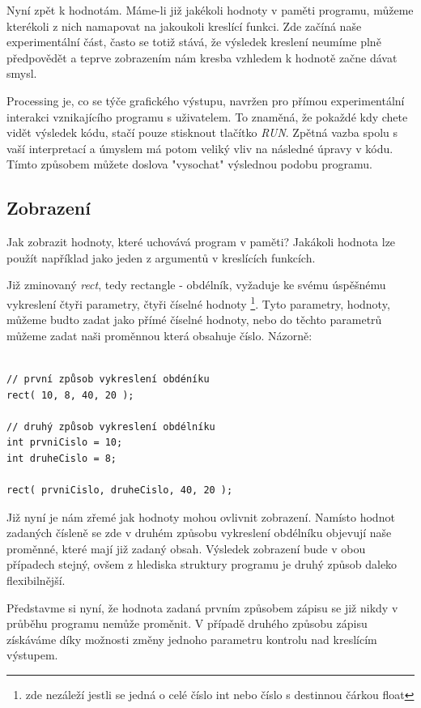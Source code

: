 \documentclass[11pt]{article}
\begin{document}
Nyní zpět k hodnotám. Máme-li již jakékoli hodnoty v paměti programu, můžeme kterékoli z nich namapovat na jakoukoli kreslící funkci. Zde začíná naše experimentální část, často se totiž stává, že výsledek kreslení neumíme plně předpovědět a teprve zobrazením nám kresba vzhledem k hodnotě začne dávat smysl.

Processing je, co se týče grafického výstupu, navržen pro přímou experimentální interakci vznikajícího programu s uživatelem. To znaměná, že pokaždé kdy chete vidět výsledek kódu, stačí pouze stisknout tlačítko {\em RUN}. Zpětná vazba spolu s vaší interpretací a úmyslem má potom veliký vliv na následné úpravy v kódu. Tímto způsobem můžete doslova "vysochat" výslednou podobu programu.

\subsection{Zobrazení}

Jak zobrazit hodnoty, které uchovává program v paměti? Jakákoli hodnota lze použít například jako jeden z argumentů v kreslících funkcích.

Již zminovaný {\em rect}, tedy rectangle - obdélník, vyžaduje ke svému úspěšnému vykreslení čtyři parametry, čtyři číselné hodnoty \footnote{zde nezáleží jestli se jedná o celé číslo int nebo číslo s destinnou čárkou float}. Tyto parametry, hodnoty, můžeme budto zadat jako přímé číselné hodnoty, nebo do těchto parametrů můžeme zadat naši proměnnou která obsahuje číslo. Názorně:

\begin{lstlisting}

// první způsob vykreslení obdéníku
rect( 10, 8, 40, 20 );

// druhý způsob vykreslení obdélníku
int prvniCislo = 10;
int druheCislo = 8;

rect( prvniCislo, druheCislo, 40, 20 );

\end{lstlisting}


Již nyní je nám zřemé jak hodnoty mohou ovlivnit zobrazení. Namísto hodnot zadaných čísleně se zde v druhém způsobu vykreslení obdélníku objevují naše proměnné, které mají již zadaný obsah. Výsledek zobrazení bude v obou případech stejný, ovšem z hlediska struktury programu je druhý způsob daleko flexibilnější.

Představme si nyní, že hodnota zadaná prvním způsobem zápisu se již nikdy v průběhu programu nemůže proměnit. V případě druhého způsobu zápisu získáváme díky možnosti změny jednoho parametru kontrolu nad kreslícím výstupem.
\end{document}
